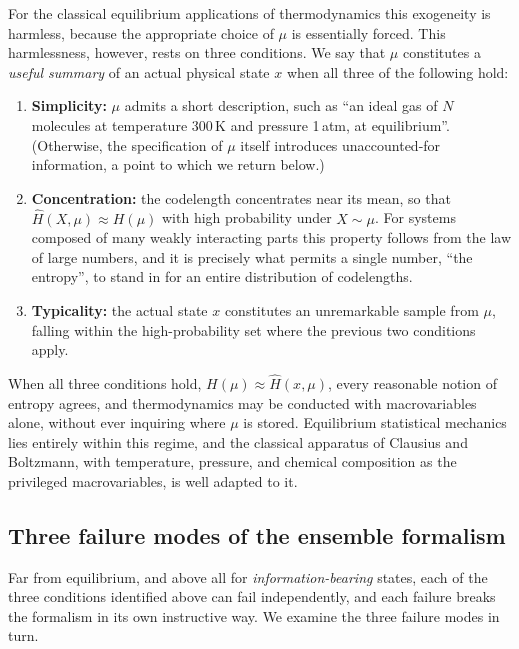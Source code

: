 \documentclass[10pt]{article}
\theoremstyle{definition}
\theoremstyle{remark}
\begin{document}
For the classical equilibrium applications of thermodynamics this exogeneity is harmless, because the appropriate choice of $\mu$ is essentially forced. This harmlessness, however, rests on three conditions. We say that $\mu$ constitutes a \emph{useful summary} of an actual physical state $x$ when all three of the following hold:
\begin{enumerate}[leftmargin=2em]
  \item \textbf{Simplicity:} $\mu$ admits a short description, such as ``an ideal gas of $N$ molecules at temperature 300\,K and pressure 1\,atm, at equilibrium''. (Otherwise, the specification of $\mu$ itself introduces unaccounted-for information, a point to which we return below.)
  \item \textbf{Concentration:} the codelength concentrates near its mean, so that $\hat H(X, \mu) \approx H(\mu)$ with high probability under $X \sim \mu$. For systems composed of many weakly interacting parts this property follows from the law of large numbers, and it is precisely what permits a single number, ``the entropy'', to stand in for an entire distribution of codelengths.
  \item \textbf{Typicality:} the actual state $x$ constitutes an unremarkable sample from $\mu$, falling within the high-probability set where the previous two conditions apply.
\end{enumerate}
When all three conditions hold, $H(\mu) \approx \hat H(x, \mu)$, every reasonable notion of entropy agrees, and thermodynamics may be conducted with macrovariables alone, without ever inquiring where $\mu$ is stored. Equilibrium statistical mechanics lies entirely within this regime, and the classical apparatus of Clausius and Boltzmann, with temperature, pressure, and chemical composition as the privileged macrovariables, is well adapted to it.

\subsection{Three failure modes of the ensemble formalism}
\label{sec:failures}

Far from equilibrium, and above all for \emph{information-bearing} states, each of the three conditions identified above can fail independently, and each failure breaks the formalism in its own instructive way. We examine the three failure modes in turn.
\end{document}
